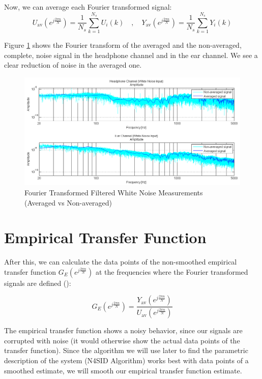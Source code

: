 Now, we can average each Fourier transformed signal:
\[U_\text{av}(e^{j\frac{2\pi n}{N}}) = \frac{1}{N_s}\sum\limits_{k = 1}^{N_s }U_i(k) \quad, \quad Y_\text{av}(e^{j\frac{2\pi n}{N}}) = \frac{1}{N_s}\sum\limits_{k = 1}^{N_s} Y_i(k)\]

Figure \ref{fig:averagedvsnonaveraged} shows the Fourier transform of the averaged and the non-averaged, complete, noise signal in the headphone channel and in the ear channel. We see a clear reduction of noise in the averaged one.

\begin{figure}[h]
\centering
\includegraphics[width=1.0\textwidth]{pics/averagedvsnonaveraged}
\caption{Fourier Transformed Filtered White Noise Measurements\\ (Averaged vs Non-averaged)}
\label{fig:averagedvsnonaveraged}
\end{figure}


\section{Empirical Transfer Function}
After this, we can calculate the data points of the non-smoothed empirical transfer function $G_E(e^{j\frac{2\pi n}{N}})$ at the frequencies where the Fourier transformed signals are defined (\cite{ljung1999system}):

\[G_E(e^{j\frac{2\pi n}{N}}) = \frac{Y_\text{av}(e^{j\frac{2\pi n}{N}})}{U_\text{av}(e^{j\frac{2\pi n}{N}})}\]


The empirical transfer function shows a noisy behavior, since our signals are corrupted with noise (it would otherwise show the actual data points of the transfer function). Since the algorithm we will use later to find the parametric description of the system (N4SID Algorithm) works best with data points of a smoothed estimate, we will smooth our empirical transfer function estimate.\\

